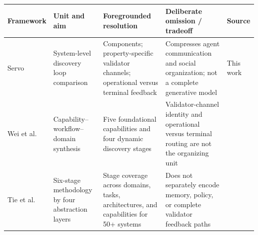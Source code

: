 \begin{tabular}{p{}p{}p{}p{}p{}}
\toprule
Framework & Unit and aim & Foregrounded resolution & Deliberate omission / tradeoff & Source \\
\midrule
Servo & System-level discovery loop comparison & Components; property-specific validator channels; operational versus terminal feedback & Compresses agent communication and social organization; not a complete generative model & This work \\
Wei et al. & Capability--workflow--domain synthesis & Five foundational capabilities and four dynamic discovery stages & Validator-channel identity and operational versus terminal routing are not the organizing unit & \citet{wei2025agenticscience} \\
Tie et al. & Six-stage methodology by four abstraction layers & Stage coverage across domains, tasks, architectures, and capabilities for 50+ systems & Does not separately encode memory, policy, or complete validator feedback paths & \citet{tie2025survey} \\
\bottomrule
\end{tabular}

